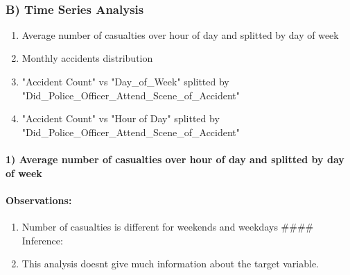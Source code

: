\documentclass[11pt]{article}
\begin{document}
    \begin{center}
    \end{center}
    { \hspace*{\fill} \\}
    
    \subsubsection{B) Time Series Analysis}\label{b-time-series-analysis}

\begin{enumerate}
\def\labelenumi{\arabic{enumi})}
\itemsep1pt\parskip0pt
\item
  Average number of casualties over hour of day and splitted by day of
  week
\item
  Monthly accidents distribution
\item
  "Accident Count" vs "Day\_of\_Week" splitted by
  "Did\_Police\_Officer\_Attend\_Scene\_of\_Accident"
\item
  "Accident Count" vs "Hour of Day" splitted by
  "Did\_Police\_Officer\_Attend\_Scene\_of\_Accident"
\end{enumerate}

    \paragraph{1) Average number of casualties over hour of day and splitted
by day of
week}\label{average-number-of-casualties-over-hour-of-day-and-splitted-by-day-of-week}

\paragraph{Observations:}\label{observations}

\begin{enumerate}
\def\labelenumi{\arabic{enumi})}
\itemsep1pt\parskip0pt
\item
  Number of casualties is different for weekends and weekdays \#\#\#\#
  Inference:
\item
  This analysis doesnt give much information about the target variable.
\end{enumerate}
\end{document}
